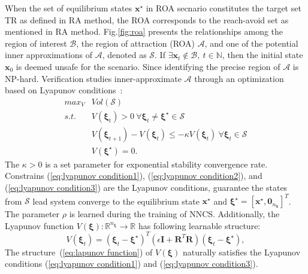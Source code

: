 \documentclass[conference]{IEEEtran}
\newcommand{\nncs}{\textsc{NNCS}\xspace}
\newcommand{\roa}{\textsc{ROA}\xspace}
\newcommand{\ra}{\textsc{RA}\xspace}
\newcommand{\myvec}[1]{\boldsymbol{#1}}
\newcommand{\mymatrix}[1]{\boldsymbol{#1}}
\newcommand{\calA}{\mathcal{A}}
\newcommand{\calB}{\mathcal{B}}
\newcommand{\calS}{\mathcal{S}}
\newcommand{\bbR}{\mathbb{R}}
\newcommand{\bbN}{\mathbb{N}}
\begin{document}
When the set of equilibrium states $\myvec{x}^{\star}$ 
in \roa secnario constitutes 
the target set TR as defined in \ra method, 
the \roa corresponds to the reach-avoid 
set as mentioned in \ra method. 
Fig.\ref{fig:roa} presents the relationships among the region of 
interest $\calB$, the region of attraction (\roa) $\calA$, 
and one of the potential inner approximations of $\calA$, 
denoted as $\calS$. 
If $\exists \myvec{x}_{t} \notin \calB,\ t\in \bbN$, 
then the initial state $\myvec{x}_{0}$ is deemed unsafe 
for the scenario. 
Since 
identifying the precise region of $\calA$ is NP-hard. 
Verification studies 
\cite{dai2021lyapunov,wu2023neural,yanglyapunov} 
inner-approximate $\calA$ 
through an optimization based on Lyapunov conditions~\cite{lyapunov1992general}:
\begin{subequations}
  \begin{align}
    max_{V} &Vol(\calS) \label{eq:lapunov optimization} \\
    s.t.&V(\myvec{\xi}_{t}) > 0\ \forall \myvec{\xi}_{t}\neq \myvec{\xi}^{\star}\in \calS \label{eq:lyapunov condition1} \\
    &V(\myvec{\xi}_{t+1}) - V(\myvec{\xi}_{t}) \leq -\kappa V(\myvec{\xi}_{t})\ \forall \myvec{\xi}_{t}\in \calS \label{eq:lyapunov condition2} \\
    &V(\myvec{\xi}^{\star}) = 0. \label{eq:lyapunov condition3}
  \end{align}
\end{subequations}
The $\kappa > 0$ is a set parameter for exponential 
stability convergence rate. Constrains (\ref{eq:lyapunov condition1}), 
(\ref{eq:lyapunov condition2}), and (\ref{eq:lyapunov condition3}) 
are the Lyapunov conditions, guarantee the states from $\calS$ 
lead system converge to the equilibrium state $\myvec{x}^{\star}$ 
and $\myvec{\xi}^{\star} = [\myvec{x}^{\star}, \myvec{0}_{n_{\myvec{x}}}]^{T}$. 
The parameter $\rho$ is learned during the training of \nncs.
Additionally, the Lyapunov function 
$V(\myvec{\xi}):\bbR^{n_{\myvec{\xi}}} \to \bbR$ 
has following learnable structure:
\begin{equation}\label{eq:lapunov function}
  V(\myvec{\xi}_{t}) = 
  (\myvec{\xi}_{t} - \myvec{\xi}^{\star})^{T}
  (\epsilon \mymatrix{I} + \mymatrix{R}^{T}\mymatrix{R})
  (\myvec{\xi}_{t} - \myvec{\xi}^{\star}),
\end{equation}
The structure~(\ref{eq:lapunov function}) of $V(\myvec{\xi})$ 
naturally satisfies the Lyapunov conditions (\ref{eq:lyapunov condition1})
and (\ref{eq:lyapunov condition3}). 
\end{document}
